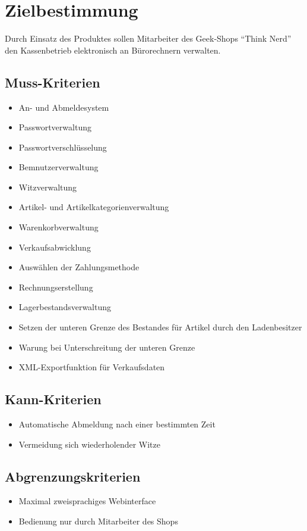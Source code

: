 \documentclass[pdftex,12pt,a4paper]{article}
\begin{document}


\tableofcontents
\newpage

\section{Zielbestimmung}
Durch Einsatz des Produktes sollen Mitarbeiter des Geek-Shops "`Think Nerd"' den Kassenbetrieb elektronisch an B\"urorechnern verwalten.
\subsection*{Muss-Kriterien}
\begin{itemize}
\item An- und Abmeldesystem
\item Passwortverwaltung
\item Passwortverschl\"usselung
\item Bemnutzerverwaltung
\item Witzverwaltung
\item Artikel- und Artikelkategorienverwaltung
\item Warenkorbverwaltung
\item Verkaufsabwicklung
\item Ausw\"ahlen der Zahlungsmethode
\item Rechnungserstellung
\item Lagerbestandsverwaltung
\item Setzen der unteren Grenze des Bestandes f\"ur Artikel durch den Ladenbesitzer
\item Warung bei Unterschreitung der unteren Grenze
\item XML-Exportfunktion f\"ur Verkaufsdaten
\end{itemize}
\subsection*{Kann-Kriterien}
\begin{itemize}
\item Automatische Abmeldung nach einer bestimmten Zeit
\item Vermeidung sich wiederholender Witze
\end{itemize}
\subsection*{Abgrenzungskriterien}
\begin{itemize}
\item Maximal zweisprachiges Webinterface
\item Bedienung nur durch Mitarbeiter des Shops
\end{itemize}
\end{document}
